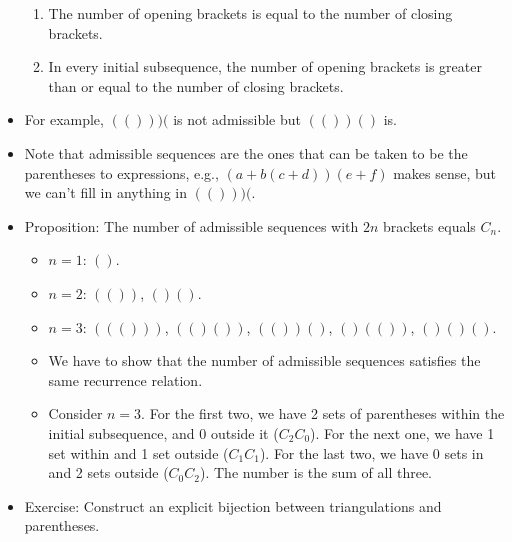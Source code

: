 \documentclass[../apprentice.tex]{subfiles}
\begin{document}
\begin{itemize}
\begin{enumerate}
        \item The number of opening brackets is equal to the number of closing brackets.
        \item In every initial subsequence, the number of opening brackets is greater than or equal to the number of closing brackets.
    \end{enumerate}
    \item For example, $(()))($ is not admissible but $(())()$ is.
    \item Note that admissible sequences are the ones that can be taken to be the parentheses to expressions, e.g., $(a+b(c+d))(e+f)$ makes sense, but we can't fill in anything in $(()))($.
    \item Proposition: The number of admissible sequences with $2n$ brackets equals $C_n$.
    \begin{itemize}
        \item $n=1$: $()$.
        \item $n=2$: $(())$, $()()$.
        \item $n=3$: $((()))$, $(()())$, $(())()$, $()(())$, $()()()$.
        \item We have to show that the number of admissible sequences satisfies the same recurrence relation.
        \item Consider $n=3$. For the first two, we have 2 sets of parentheses within the initial subsequence, and 0 outside it ($C_2C_0$). For the next one, we have 1 set within and 1 set outside ($C_1C_1$). For the last two, we have 0 sets in and 2 sets outside ($C_0C_2$). The number is the sum of all three.
    \end{itemize}
    \item Exercise: Construct an explicit bijection between triangulations and parentheses.
\end{itemize}
\end{document}
